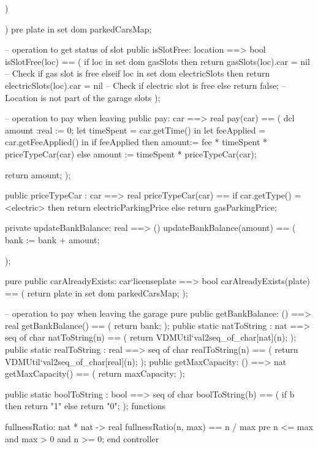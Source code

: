 \documentclass[a4paper]{article}
\begin{document}
\begin{vdm_al}
            )
        
    
     
)
pre plate in set dom parkedCarsMap;


-- operation to get status of slot
public isSlotFree: location ==> bool
isSlotFree(loc) == (
    if loc in set dom gasSlots then
        return gasSlots(loc).car = nil  -- Check if gas slot is free
    elseif loc in set dom electricSlots then
        return electricSlots(loc).car = nil  -- Check if electric slot is free
    else return false;  -- Location is not part of the garage slots
);

-- operation to pay when leaving
public pay: car ==> real
pay(car) ==
(   
    dcl amount :real := 0;
    let timeSpent = car.getTime() in
    let feeApplied = car.getFeeApplied() in
    if feeApplied then
        amount:= fee * timeSpent * priceTypeCar(car)
    else
        amount := timeSpent * priceTypeCar(car);
    
    return amount;
);

public priceTypeCar : car ==> real
priceTypeCar(car) ==
    if car.getType() = <electric> then
        return electricParkingPrice
    else
        return gasParkingPrice;

private updateBankBalance: real ==> ()
updateBankBalance(amount) == (
    bank := bank + amount;

);

pure public carAlreadyExists: car`licenseplate ==> bool
carAlreadyExists(plate) == (
    return plate in set dom parkedCarsMap;
);

-- operation to pay when leaving the garage
pure public getBankBalance: () ==> real
getBankBalance() == (
    return bank;
);
public static natToString : nat ==> seq of char 
  natToString(n) ==
  (
   return VDMUtil`val2seq_of_char[nat](n);
  );
public static realToString : real ==> seq of char
realToString(n) ==
(
    return VDMUtil`val2seq_of_char[real](n);
);
public getMaxCapacity: () ==> nat
getMaxCapacity() == (
    return maxCapacity;
);

public static boolToString : bool ==> seq of char
boolToString(b) ==
(
    if b then
        return "1"
    else
        return "0";
);
functions

fullnessRatio: nat * nat -> real
fullnessRatio(n, max) == 
    n / max
    pre n <= max and max > 0 and n >= 0;
end controller
\end{vdm_al}
\end{document}
